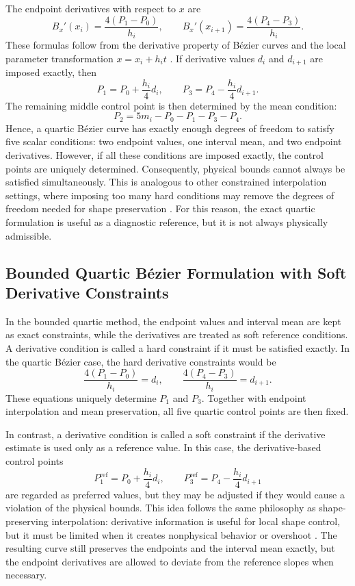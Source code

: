 \documentclass[12pt,a4paper]{article}
\begin{document}
The endpoint derivatives with respect to \(x\) are
\[
B_x'(x_i)=\frac{4(P_1-P_0)}{h_i},
\qquad
B_x'(x_{i+1})=\frac{4(P_4-P_3)}{h_i}.
\]
These formulas follow from the derivative property of B\'ezier curves and the local parameter transformation \(x=x_i+h_i t\) \cite{farin2002curves,mitBezierProperties}. If derivative values \(d_i\) and \(d_{i+1}\) are imposed exactly, then
\[
P_1=P_0+\frac{h_i}{4}d_i,
\qquad
P_3=P_4-\frac{h_i}{4}d_{i+1}.
\]
The remaining middle control point is then determined by the mean condition:
\[
P_2=5m_i-P_0-P_1-P_3-P_4.
\]
Hence, a quartic B\'ezier curve has exactly enough degrees of freedom to satisfy five scalar conditions: two endpoint values, one interval mean, and two endpoint derivatives. However, if all these conditions are imposed exactly, the control points are uniquely determined. Consequently, physical bounds cannot always be satisfied simultaneously. This is analogous to other constrained interpolation settings, where imposing too many hard conditions may remove the degrees of freedom needed for shape preservation \cite{fritsch1980monotone,fritsch1984monotone}. For this reason, the exact quartic formulation is useful as a diagnostic reference, but it is not always physically admissible.

\subsection{Bounded Quartic B\'ezier Formulation with Soft Derivative Constraints}

In the bounded quartic method, the endpoint values and interval mean are kept as exact constraints, while the derivatives are treated as soft reference conditions. A derivative condition is called a hard constraint if it must be satisfied exactly. In the quartic B\'ezier case, the hard derivative constraints would be
\[
\frac{4(P_1-P_0)}{h_i}=d_i,
\qquad
\frac{4(P_4-P_3)}{h_i}=d_{i+1}.
\]
These equations uniquely determine \(P_1\) and \(P_3\). Together with endpoint interpolation and mean preservation, all five quartic control points are then fixed.

In contrast, a derivative condition is called a soft constraint if the derivative estimate is used only as a reference value. In this case, the derivative-based control points
\[
P_1^{\mathrm{ref}}=P_0+\frac{h_i}{4}d_i,
\qquad
P_3^{\mathrm{ref}}=P_4-\frac{h_i}{4}d_{i+1}
\]
are regarded as preferred values, but they may be adjusted if they would cause a violation of the physical bounds. This idea follows the same philosophy as shape-preserving interpolation: derivative information is useful for local shape control, but it must be limited when it creates nonphysical behavior or overshoot \cite{fritsch1980monotone,fritsch1984monotone,scipyPchip}. The resulting curve still preserves the endpoints and the interval mean exactly, but the endpoint derivatives are allowed to deviate from the reference slopes when necessary.
\end{document}
